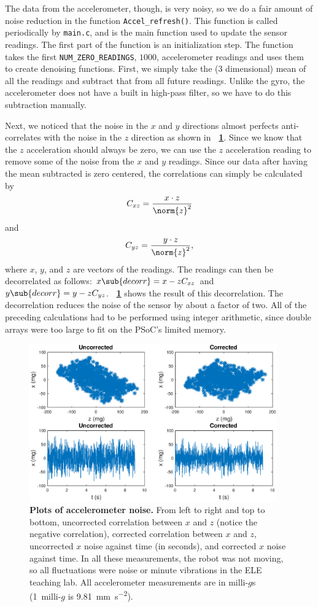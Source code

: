 \documentclass[letterpaper, 11pt]{article}
\newcommand*{\figref}[1]{\textbf{\figurename~\ref{#1}}}
\begin{document}
\begin{enumerate}[label=\textbf{\arabic*.}]
The data from the accelerometer, though, is very noisy, so we do a fair amount of noise reduction in the function \verb|Accel_refresh()|. This function is called periodically by \verb|main.c|, and is the main function used to update the sensor readings. The first part of the function is an initialization step. The function takes the first \verb|NUM_ZERO_READINGS|, $1000$, accelerometer readings and uses them to create denoising functions. First, we simply take the (3 dimensional) mean of all the readings and subtract that from all future readings. Unlike the gyro, the accelerometer does not have a built in high-pass filter, so we have to do this subtraction manually. 

Next, we noticed that the noise in the $x$ and $y$ directions almost perfects anti-correlates with the noise in the $z$ direction as shown in \figref{fig:accel-plots}. Since we know that the $z$ acceleration should always be zero, we can use the $z$ acceleration reading to remove some of the noise from the $x$ and $y$ readings. Since our data after having the mean subtracted is zero centered, the correlations can simply be calculated by \[C_{xz} = \frac{x \cdot z}{\norm{z}^2}\] and \[C_{yz} = \frac{y \cdot z}{\norm{z}^2},\] where $x$, $y$, and $z$ are vectors of the readings. The readings can then be decorrelated as follows: $x\sub{decorr} = x - zC_{xz}$ and $y\sub{decorr} = y - zC_{yz}$. \figref{fig:accel-plots} shows the result of this decorrelation. The decorrelation reduces the noise of the sensor by about a factor of two. All of the preceding calculations had to be performed using integer arithmetic, since double arrays were too large to fit on the PSoC's limited memory.

\begin{figure}[ht]
    \centering
    \includegraphics[width=0.95\textwidth]{images/accel-plots.eps}
    \caption{\textbf{Plots of accelerometer noise.} From left to right and top to bottom, uncorrected correlation between $x$ and $z$ (notice the negative correlation), corrected correlation between $x$ and $z$, uncorrected $x$ noise against time (in seconds), and corrected $x$ noise against time. In all these measurements, the robot was not moving, so all fluctuations were noise or minute vibrations in the ELE teaching lab. All accelerometer measurements are in milli-$g$s (1~milli-$g$ is \SI{9.81}{\milli\meter\per\second\squared}).}
    \label{fig:accel-plots}
\end{figure}


\end{enumerate}
\end{document}
